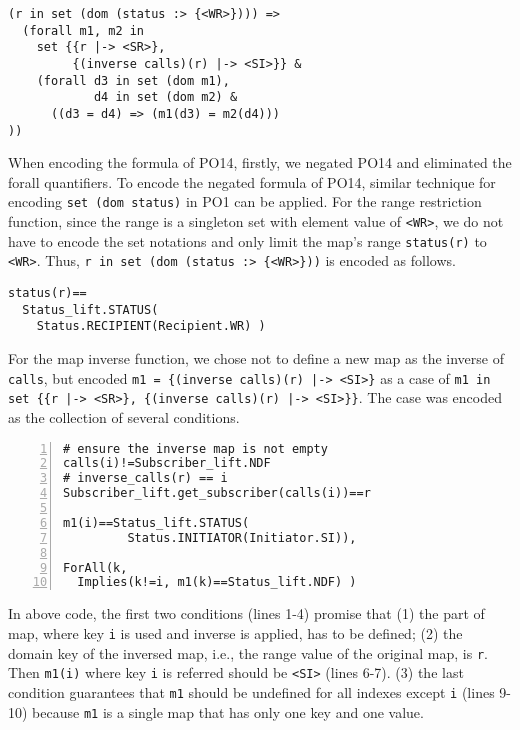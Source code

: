 \begin{mdframed}[roundcorner=5pt]
\begin{Verbatim}[fontsize=\small]
(r in set (dom (status :> {<WR>}))) =>
  (forall m1, m2 in 
    set {{r |-> <SR>}, 
         {(inverse calls)(r) |-> <SI>}} &
    (forall d3 in set (dom m1),
            d4 in set (dom m2) &
      ((d3 = d4) => (m1(d3) = m2(d4)))
))
\end{Verbatim}
\end{mdframed}

When encoding the formula of PO14, firstly, we negated PO14 and eliminated the forall quantifiers. To encode the negated formula of PO14, similar technique for  encoding {\tt set (dom status)} in PO1 can be applied. For the range restriction function, since the range is a singleton set with element value of {\tt <WR>}, we do not have to encode the set notations and only limit the map's range {\tt status(r)} to {\tt <WR>}. Thus, {\tt r in set (dom (status :> \{<WR>\}))} is encoded as follows.

\begin{mdframed}[roundcorner=5pt,shadow=true]
\begin{Verbatim}[fontsize=\small]
status(r)==
  Status_lift.STATUS(
    Status.RECIPIENT(Recipient.WR) )
\end{Verbatim}
\end{mdframed}

For the map inverse function, we chose not to define a new map as the inverse of {\tt calls}, but encoded {\tt m1 = \{(inverse calls)(r) |-> <SI>\}} as a case of {\tt m1 in set \{\{r |-> <SR>\}, \{(inverse calls)(r) |-> <SI>\}\}}. The case was encoded as the collection of several conditions. 

\begin{mdframed}[roundcorner=5pt,shadow=true]
\begin{Verbatim}[fontsize=\small,numbers=left]
# ensure the inverse map is not empty
calls(i)!=Subscriber_lift.NDF 
# inverse_calls(r) == i
Subscriber_lift.get_subscriber(calls(i))==r

m1(i)==Status_lift.STATUS(
         Status.INITIATOR(Initiator.SI)),

ForAll(k, 
  Implies(k!=i, m1(k)==Status_lift.NDF) )
\end{Verbatim}
\end{mdframed}

In above code, the first two conditions (lines 1-4) promise that (1) the part of map, where key {\tt i} is used and inverse is applied, has to be defined; (2) the domain key of the inversed map, i.e., the range value of the original map, is {\tt r}. Then {\tt m1(i)} where key {\tt i} is referred should be {\tt <SI>} (lines 6-7). (3) the last condition guarantees that {\tt m1} should be undefined for all indexes except {\tt i} (lines 9-10) because {\tt m1} is a single map that has only one key and one value.

